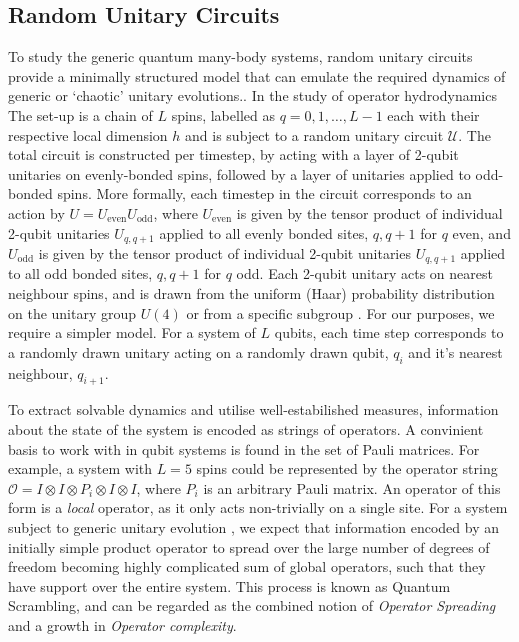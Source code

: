 \subsection{Random Unitary Circuits}
To study the generic quantum many-body systems, random unitary circuits provide a minimally structured model that can emulate the required dynamics of generic or `chaotic' unitary evolutions.\cite{https://doi.org/10.48550/arxiv.2210.10129}.
In the study of operator hydrodynamics The set-up is a chain of $L$ spins, labelled as $q = 0, 1, \dots, L-1$ each with their respective local dimension $h$ and is subject to a random unitary circuit $\mathcal{U}$. The total circuit is constructed per timestep, by acting with a layer of 2-qubit unitaries on evenly-bonded spins, followed by a layer of unitaries applied to odd-bonded spins. More formally, each timestep in the circuit corresponds to an action by $U = U_{\text{even}} U_{\text{odd}}$, where $U_{\text{even}}$ is given by the tensor product of individual 2-qubit unitaries $U_{q, q+1}$ applied to all evenly bonded sites, $q, q+1$ for $q$ even,  and $U_{\text{odd}}$ is given by the tensor product of individual 2-qubit unitaries $U_{q, q+1}$ applied to all odd bonded sites, $q, q+1$ for $q$ odd. Each 2-qubit unitary acts on nearest neighbour spins, and is drawn from the uniform (Haar) probability distribution on the unitary group $U(4)$ or from a specific subgroup \cite{hunterjones2018operator}.
For our purposes, we require a simpler model. For a system of $L$ qubits, each time step corresponds to a randomly drawn unitary acting on a randomly drawn qubit, $q_i$ and it's nearest neighbour, $q_{i+1}$.


To extract solvable dynamics and utilise well-estabilished measures, information about the state of the system is encoded as strings of operators. A convinient basis to work with in qubit systems is found in the set of Pauli matrices.
For example, a system with $L = 5$ spins could be represented by the operator string $\mathcal{O} = I \otimes I \otimes P_i \otimes I \otimes I$, where $P_i$ is an arbitrary Pauli matrix. An operator of this form is a \textit{local} operator, as it only acts non-trivially on a single site. 
For a system subject to generic unitary evolution , we expect that information encoded by an initially simple product operator to spread over the large number of degrees of freedom becoming highly complicated sum of global operators, such that they have support over the entire system. This process is known as Quantum Scrambling, and can be regarded as the combined notion of \textit{Operator Spreading} and a growth in \textit{Operator complexity}. 

